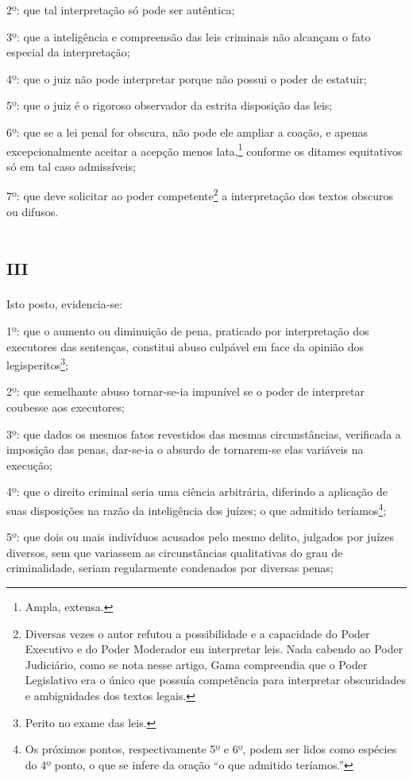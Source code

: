 2º: que tal interpretação só pode ser autêntica;

3º: que a inteligência e compreensão das leis criminais não alcançam o
fato especial da interpretação;

4º: que o juiz não pode interpretar porque não possui o poder de
estatuir;

5º: que o juiz é o rigoroso observador da estrita disposição das leis;

6º: que se a lei penal for obscura, não pode ele ampliar a coação, e
apenas excepcionalmente aceitar a acepção menos lata,\footnote{Ampla,
  extensa.} conforme os ditames equitativos só em tal caso admissíveis;

7º: que deve solicitar ao poder competente\footnote{Diversas vezes o
  autor refutou a possibilidade e a capacidade do Poder Executivo e do
  Poder Moderador em interpretar leis. Nada cabendo ao Poder Judiciário,
  como se nota nesse artigo, Gama compreendia que o Poder Legislativo
  era o único que possuía competência para interpretar obscuridades e
  ambiguidades dos textos legais.} a interpretação dos textos obscuros
ou difusos.

\section{\textsc{iii}}

Isto posto, evidencia-se:

1º: que o aumento ou diminuição de pena, praticado por interpretação dos
executores das sentenças, constitui abuso culpável em face da opinião
dos legisperitos\footnote{Perito no exame das leis.};

2º: que semelhante abuso tornar-se-ia impunível se o poder de
interpretar coubesse aos executores;

3º: que dados os mesmos fatos revestidos das mesmas circunstâncias,
verificada a imposição das penas, dar-se-ia o absurdo de tornarem-se
elas variáveis na execução;

4º: que o direito criminal seria uma ciência arbitrária, diferindo a
aplicação de suas disposições na razão da inteligência dos juízes; o que
admitido teríamos\footnote{Os próximos pontos, respectivamente 5º e
  6º, podem ser lidos como espécies do 4º ponto, o que se infere da
  oração ``o que admitido teríamos.''};

5º: que dois ou mais indivíduos acusados pelo mesmo delito, julgados por
juízes diversos, sem que variassem as circunstâncias qualitativas do
grau de criminalidade, seriam regularmente condenados por diversas
penas;

